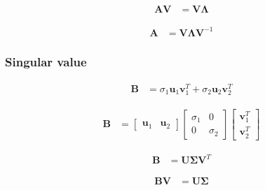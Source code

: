 \documentclass{article}
\begin{document}
\begin{align}
	\mathbf{A}\mathbf{V} & =\mathbf{V}\mathbf{\Lambda}
\end{align}

\begin{align}
	\mathbf{A} & =\mathbf{V}\mathbf{\Lambda}\mathbf{V}^{-1}
\end{align}

\subsubsection{Singular value}

\begin{align}
	\mathbf{B} & =\sigma_{1}\mathbf{u}_{1}\mathbf{v}_{1}^{T}+\sigma_{2}\mathbf{u}_{2}\mathbf{v}_{2}^{T}
\end{align}

\begin{align}
	\mathbf{B} & =\left[\begin{array}{cc}
		\mathbf{u}_{1} & \mathbf{u}_{2}\end{array}\right]\left[\begin{array}{cc}
		\sigma_{1} & 0\\
		0 & \sigma_{2}
	\end{array}\right]\left[\begin{array}{c}
		\mathbf{v}_{1}^{T}\\
		\mathbf{v}_{2}^{T}
	\end{array}\right]
\end{align}

\begin{align}
	\mathbf{B} & =\mathbf{U}\mathbf{\Sigma}\mathbf{V}^{T}
\end{align}

\begin{align}
	\mathbf{B}\mathbf{V} & =\mathbf{U}\mathbf{\Sigma}
\end{align}



\end{document}
